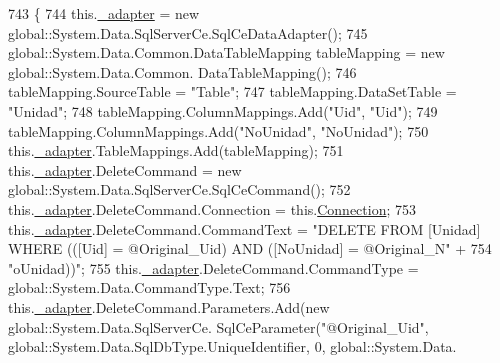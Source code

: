 \begin{DoxyCode}
743                                    \{
744             this.\hyperlink{class_proyecto___integrador__3_1_1ds_unidad_table_adapters_1_1_unidad_table_adapter_ab399a596bea65cb98131fe8b2f74a979}{\_adapter} = \textcolor{keyword}{new} global::System.Data.SqlServerCe.SqlCeDataAdapter();
745             global::System.Data.Common.DataTableMapping tableMapping = \textcolor{keyword}{new} global::System.Data.Common.
      DataTableMapping();
746             tableMapping.SourceTable = \textcolor{stringliteral}{"Table"};
747             tableMapping.DataSetTable = \textcolor{stringliteral}{"Unidad"};
748             tableMapping.ColumnMappings.Add(\textcolor{stringliteral}{"Uid"}, \textcolor{stringliteral}{"Uid"});
749             tableMapping.ColumnMappings.Add(\textcolor{stringliteral}{"NoUnidad"}, \textcolor{stringliteral}{"NoUnidad"});
750             this.\hyperlink{class_proyecto___integrador__3_1_1ds_unidad_table_adapters_1_1_unidad_table_adapter_ab399a596bea65cb98131fe8b2f74a979}{\_adapter}.TableMappings.Add(tableMapping);
751             this.\hyperlink{class_proyecto___integrador__3_1_1ds_unidad_table_adapters_1_1_unidad_table_adapter_ab399a596bea65cb98131fe8b2f74a979}{\_adapter}.DeleteCommand = \textcolor{keyword}{new} global::System.Data.SqlServerCe.SqlCeCommand();
752             this.\hyperlink{class_proyecto___integrador__3_1_1ds_unidad_table_adapters_1_1_unidad_table_adapter_ab399a596bea65cb98131fe8b2f74a979}{\_adapter}.DeleteCommand.Connection = this.\hyperlink{class_proyecto___integrador__3_1_1ds_unidad_table_adapters_1_1_unidad_table_adapter_a13a9c13fd0ce4e17d7f35891158864db}{Connection};
753             this.\hyperlink{class_proyecto___integrador__3_1_1ds_unidad_table_adapters_1_1_unidad_table_adapter_ab399a596bea65cb98131fe8b2f74a979}{\_adapter}.DeleteCommand.CommandText = \textcolor{stringliteral}{"DELETE FROM [Unidad] WHERE (([Uid] =
       @Original\_Uid) AND ([NoUnidad] = @Original\_N"} +
754                 \textcolor{stringliteral}{"oUnidad))"};
755             this.\hyperlink{class_proyecto___integrador__3_1_1ds_unidad_table_adapters_1_1_unidad_table_adapter_ab399a596bea65cb98131fe8b2f74a979}{\_adapter}.DeleteCommand.CommandType = global::System.Data.CommandType.Text;
756             this.\hyperlink{class_proyecto___integrador__3_1_1ds_unidad_table_adapters_1_1_unidad_table_adapter_ab399a596bea65cb98131fe8b2f74a979}{\_adapter}.DeleteCommand.Parameters.Add(\textcolor{keyword}{new} global::System.Data.SqlServerCe.
      SqlCeParameter(\textcolor{stringliteral}{"@Original\_Uid"}, global::System.Data.SqlDbType.UniqueIdentifier, 0, global::System.Data.

\end{DoxyCode}
